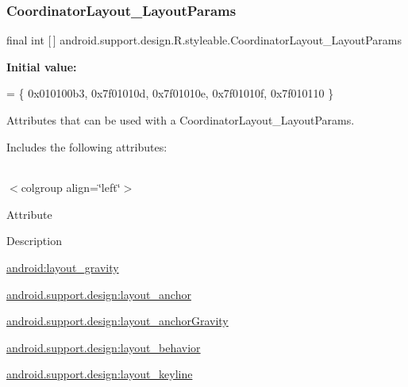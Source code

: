 \subsubsection{\texorpdfstring{Coordinator\+Layout\+\_\+\+Layout\+Params}{CoordinatorLayout\_LayoutParams}}
{\footnotesize\ttfamily final int \mbox{[}$\,$\mbox{]} android.\+support.\+design.\+R.\+styleable.\+Coordinator\+Layout\+\_\+\+Layout\+Params\hspace{0.3cm}{\ttfamily [static]}}

{\bfseries Initial value\+:}
\begin{DoxyCode}
= \{
            0x010100b3, 0x7f01010d, 0x7f01010e, 0x7f01010f,
            0x7f010110
        \}
\end{DoxyCode}
Attributes that can be used with a Coordinator\+Layout\+\_\+\+Layout\+Params. 

Includes the following attributes\+:

\tabulinesep=1mm
\begin{longtabu} spread 0pt [c]{*{0}{|X[-1]}|}
\hline
\end{longtabu}
$<$colgroup align=\char`\"{}left\char`\"{}$>$ 

Attribute

Description 

{\ttfamily \hyperlink{classandroid_1_1support_1_1design_1_1R_1_1styleable_a4f19a966939e4daa90156b8714754325}{android\+:layout\+\_\+gravity}}

{\ttfamily \hyperlink{classandroid_1_1support_1_1design_1_1R_1_1styleable_a2b541addd48569ad627329eb45eb5445}{android.\+support.\+design\+:layout\+\_\+anchor}}

{\ttfamily \hyperlink{classandroid_1_1support_1_1design_1_1R_1_1styleable_a62798f0cfacf5c8b36479c1585a47c87}{android.\+support.\+design\+:layout\+\_\+anchor\+Gravity}}

{\ttfamily \hyperlink{classandroid_1_1support_1_1design_1_1R_1_1styleable_a7080bda2bea789b4e55596a0b650c34e}{android.\+support.\+design\+:layout\+\_\+behavior}}

{\ttfamily \hyperlink{classandroid_1_1support_1_1design_1_1R_1_1styleable_a4261fa2784dbde0962e2046fc2bbfb18}{android.\+support.\+design\+:layout\+\_\+keyline}}

